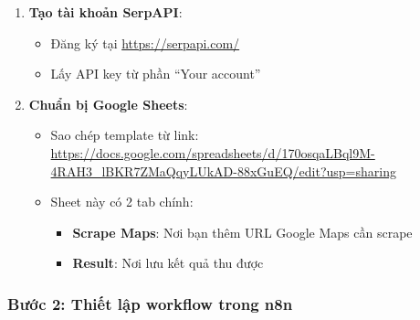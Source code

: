 \begin{enumerate}
  \item \textbf{Tạo tài khoản SerpAPI}:
  \begin{itemize}
    \item Đăng ký tại \url{https://serpapi.com/}
    \item Lấy API key từ phần ``Your account''
  \end{itemize}

  \item \textbf{Chuẩn bị Google Sheets}:
  \begin{itemize}
    \item Sao chép template từ link: \url{https://docs.google.com/spreadsheets/d/170osqaLBql9M-4RAH3_lBKR7ZMaQqyLUkAD-88xGuEQ/edit?usp=sharing}
    \item Sheet này có 2 tab chính:
    \begin{itemize}
      \item \textbf{Scrape Maps}: Nơi bạn thêm URL Google Maps cần scrape
      \item \textbf{Result}: Nơi lưu kết quả thu được
    \end{itemize}
  \end{itemize}
\end{enumerate}

\subsubsection{Bước 2: Thiết lập workflow trong n8n}

